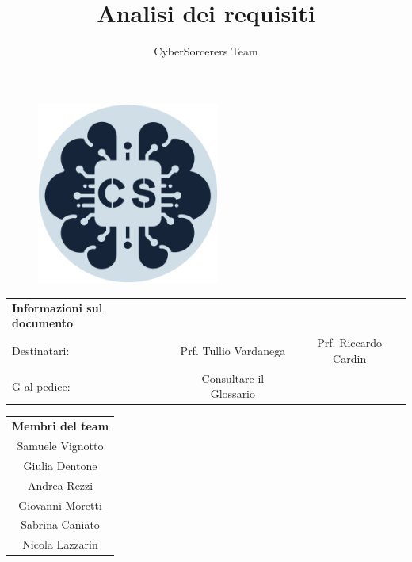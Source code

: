 \documentclass{article}
\title{\Huge{\textbf{Analisi dei requisiti}}\vspace{-1em}}
\author{CyberSorcerers Team}
\date{}
\begin{document}
\maketitle

\vspace{-3em}
\begin{figure}[h]
  \centering
  \includegraphics[width=6cm, height=6cm]{documenti/logo rotondo.png}
  \label{fig:immagine}
\end{figure}

\vspace{6em}
\large{

\begin{center}
    \begin{tabular}{l c c}
        \rowcolor{Blue} 
        \textbf{Informazioni sul documento} & &\\ [1 ex]
        \rowcolor{LighterBlue}
        Destinatari: & Prf. Tullio Vardanega & Prf. Riccardo Cardin\\ [1 ex]
        \rowcolor{LightBlue}
        G al pedice: & Consultare il Glossario & \\ [1 ex]
    \end{tabular}
\end{center}}

\begin{table}[h]
\centering
\begin{tabular}{c}
\rowcolor{Blue}
\textbf{Membri del team} \\
\rowcolor{LighterBlue}
Samuele Vignotto \\
\rowcolor{LightBlue}
Giulia Dentone \\
\rowcolor{LighterBlue}
Andrea Rezzi \\
\rowcolor{LightBlue}
Giovanni Moretti \\
\rowcolor{LighterBlue}
Sabrina Caniato \\
\rowcolor{LightBlue}
Nicola Lazzarin \\
\end{tabular}
\end{table}
\end{document}
